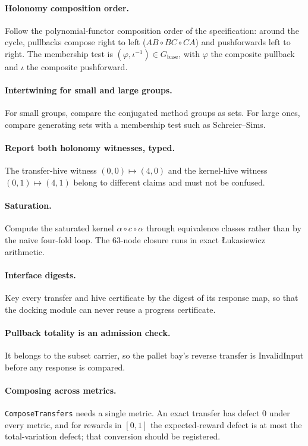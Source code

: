 \documentclass[11pt]{article}
\newcommand{\code}[1]{\texttt{#1}}
\theoremstyle{definition}
\theoremstyle{plain}
\begin{document}
\paragraph{Holonomy composition order.} Follow the polynomial-functor composition order of the
specification: around the cycle, pullbacks compose right to left ($AB\circ BC\circ CA$) and
pushforwards left to right. The membership test is $(\varphi,\iota^{-1})\in G_{\mathrm{base}}$, with
$\varphi$ the composite pullback and $\iota$ the composite pushforward.

\paragraph{Intertwining for small and large groups.} For small groups, compare the conjugated method
groups as sets. For large ones, compare generating sets with a membership test such as
Schreier--Sims.

\paragraph{Report both holonomy witnesses, typed.} The transfer-hive witness $(0,0)\mapsto(4,0)$ and
the kernel-hive witness $(0,1)\mapsto(4,1)$ belong to different claims and must not be confused.

\paragraph{Saturation.} Compute the saturated kernel $\alpha\circ c\circ\alpha$ through equivalence
classes rather than by the naive four-fold loop. The $63$-node closure runs in exact
\L{}ukasiewicz arithmetic.

\paragraph{Interface digests.} Key every transfer and hive certificate by the digest of its response
map, so that the docking module can never reuse a progress certificate.

\paragraph{Pullback totality is an admission check.} It belongs to the subset carrier, so the pallet
bay's reverse transfer is InvalidInput before any response is compared.

\paragraph{Composing across metrics.} \code{ComposeTransfers} needs a single metric. An exact transfer
has defect $0$ under every metric, and for rewards in $[0,1]$ the expected-reward defect is at most the
total-variation defect; that conversion should be registered.
\end{document}
